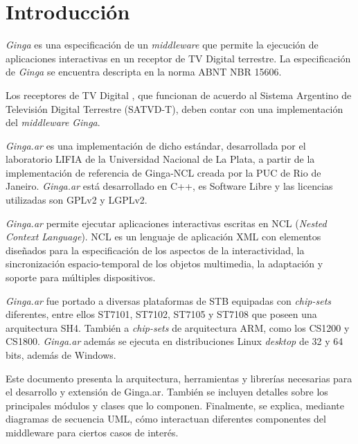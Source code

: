 \setlength{\parskip}{5mm}
\setlength{\parindent}{5mm}

\linespread{1.1}%
\selectfont	

\section{Introducción}

\emph{Ginga} es una especificación de un \textit{middleware} que permite la ejecución 
de aplicaciones interactivas en un receptor de TV Digital terrestre.
La especificación de \emph{Ginga} se encuentra descripta  en la 
norma ABNT NBR 15606.



Los receptores de TV Digital , que funcionan de acuerdo al 
Sistema Argentino de Televisión Digital Terrestre (SATVD-T), deben contar con 
una  implementación del \textit{middleware} \emph{Ginga}. 

\emph{Ginga.ar} es una implementación de dicho estándar, desarrollada por el laboratorio
LIFIA de la Universidad Nacional de La Plata, a partir de la implementación 
de referencia de Ginga-NCL creada por la PUC de Rio de Janeiro. \emph{Ginga.ar} está 
desarrollado  en C++, es Software Libre y las licencias utilizadas son GPLv2 
y LGPLv2.

\emph{Ginga.ar} permite ejecutar aplicaciones interactivas   escritas en NCL 
(\textit{Nested Context Language}). 
NCL es  un lenguaje de aplicación XML con elementos diseñados para la 
especificación de  los aspectos de la interactividad, la sincronización 
espacio-temporal de los  objetos multimedia, la adaptación y soporte 
para múltiples dispositivos.

\emph{Ginga.ar} fue portado a diversas plataformas de STB equipadas con  
\textit{chip-sets} diferentes, entre ellos ST7101, ST7102, ST7105 y ST7108 que poseen 
una
arquitectura SH4. También a \textit{chip-sets} de arquitectura ARM, como los CS1200 y 
CS1800.
\emph{Ginga.ar} además se ejecuta en distribuciones Linux \textit{desktop} de 32 y 64 bits, 
además de Windows.

Este documento presenta la arquitectura, herramientas y librerías necesarias para el desarrollo y extensión de Ginga.ar.
También se incluyen detalles sobre los principales módulos y clases que lo componen.
Finalmente, se explica, mediante diagramas de secuencia UML, cómo interactuan diferentes componentes del middleware para ciertos casos de interés.

